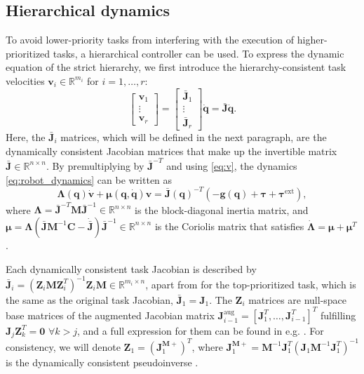 \documentclass[../main.tex]{subfiles}
\begin{document}
\subsection{Hierarchical dynamics}
To avoid lower-priority tasks from interfering with the execution of higher-prioritized tasks, a hierarchical controller can be used. To express the dynamic equation of the strict hierarchy, we first introduce the hierarchy-consistent task velocities $\bm{v}_i \in \mathbb{R}^{m_i}$ for $i=1,\dots,r$:
\begin{equation}\label{eq:v}
    \begin{bmatrix}
        \bm{v}_1 \\
        \vdots \\
        \bm{v}_r
    \end{bmatrix} =
    \begin{bmatrix}
        \bar{\bm{J}}_1 \\
        \vdots \\
        \bar{\bm{J}}_r
    \end{bmatrix} \bm{\dot{q}}
    =
    \bar{\bm{J}} \bm{\dot{q}}.
\end{equation}
Here, the $\bar{\bm{J}}_i$ matrices, which will be defined in the next paragraph, are the dynamically consistent Jacobian matrices that make up the invertible matrix $\bar{\bm{J}} \in \mathbb{R}^{n\times n}$. %
By premultiplying by $\bar{\bm{J}}^{-T}$ and using \eqref{eq:v}, the dynamics \eqref{eq:robot_dynamics} can be written as %
\begin{equation} \label{eq:hierarchical_dynamics}
    \bm{\Lambda}(\bm{q})\dot{\bm{v}} + \bm{\mu}(\bm{q},\dot{\bm{q}})\bm{v} = \bar{\bm{J}}(\bm{q})^{-T}\left( -\bm{g}(\bm{q}) + \bm{\tau} + \bm{\tau}^{\mathrm{ext}}\right),
\end{equation}
where $\bm{\Lambda} = \bar{\bm{J}}^{-T}\bm{M}\bar{\bm{J}}^{-1} \in \mathbb{R}^{n\times n}$ is the block-diagonal inertia matrix, and $\bm{\mu}=\bm{\Lambda}\left( \bar{\bm{J}}\bm{M}^{-1}\bm{C} - \dot{\bar{\bm{J}}} \right)\bar{\bm{J}}^{-1} \in \mathbb{R}^{n\times n}$ is the Coriolis matrix that satisfies $\dot{\bm{\Lambda}} = \bm{\mu} + \bm{\mu}^T$.

Each dynamically consistent task Jacobian is described by $\bar{\bm{J}}_i = \left( \bm{Z}_i \bm{M}\bm{Z}_i^T \right)^{-1}\bm{Z}_i\bm{M} \in \mathbb{R}^{m_i\times n}$, apart from for the top-prioritized task, which is the same as the original task Jacobian, $\bar{\bm{J}}_1 = \bm{J}_1$. The $\bm{Z}_i$ matrices are null-space base matrices of the augmented Jacobian matrix $\bm{J}^{\mathrm{aug}}_{i-1} = \left[ \bm{J}_1^T, \dots, \bm{J}_{i-1}^T \right]^T$ fulfilling $\bm{J}_j \bm{Z}_k^T=\bm{0}$ $\forall k>j$, and a full expression for them can be found in e.g. \cite{ottPrioritizedMultiTaskCompliance2015}.
For consistency, we will denote $\bm{Z}_1 = \left( \bm{J}_1^{\bm{M}+} \right)^T$, where $\bm{J}_{1}^{\bm{M}+}=\bm{M}^{-1}\bm{J}_{1}^T(\bm{J}_{1}\bm{M}^{-1}\bm{J}_{1}^T)^{-1}$ is the dynamically consistent pseudoinverse \cite{khatibUnifiedApproachMotion1987}.
\end{document}
